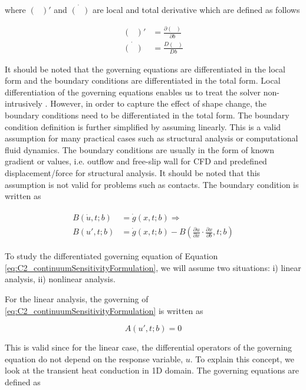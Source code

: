 where $(\text{ })'$ and $\dot{(\text{ })}$ are local and total derivative which are defined as follows

\begin{subequations}
\begin{align*}
	(\text{ })' &= \frac{\partial (\text{ })}{\partial b} \\
	\dot{(\text{ })} &= \frac{D (\text{ })}{D b}
\end{align*}
\end{subequations}

It should be noted that the governing equations are differentiated in the local form and the boundary conditions are differentiated in the total form. Local differentiation of the governing equations enables us to treat the solver non-intrusively \cite{cross2014local}. However, in order to capture the effect of shape change, the boundary conditions need to be differentiated in the total form. The boundary condition definition is further simplified by assuming linearly. This is a valid assumption for many practical cases such as structural analysis or computational fluid dynamics. The boundary conditions are usually in the form of known gradient or values, i.e. outflow and free-slip wall for CFD and predefined displacement/force for structural analysis. It should be noted that this assumption is not valid for problems such as contacts. The boundary condition is written as

\begin{align}\label{eq:C2_linearSAboundaryCondtions}
\begin{split}
	B(\dot{u}, t; b) &= \dot{g}(x, t; b) \Rightarrow \\
	B(u', t; b) &= \dot{g}(x, t; b) - B(\frac{\partial u}{\partial x} \cdot \frac{\partial x}{\partial b}, t; b)
\end{split}
\end{align}

To study the differentiated governing equation of Equation \eqref{eq:C2_continuumSensitivityFormulation}, we will assume two situations: i) linear analysis, ii) nonlinear analysis.

For the linear analysis, the governing  of \eqref{eq:C2_continuumSensitivityFormulation} is written as

\begin{equation}\label{eq:C2_linearSAgoverningEquation}
	A(u', t; b) = 0 
\end{equation}

This is valid since for the linear case, the differential operators of the governing equation do not depend on the response variable, $u$. To explain this concept, we look at the transient heat conduction in 1D domain. The governing equations are defined as


